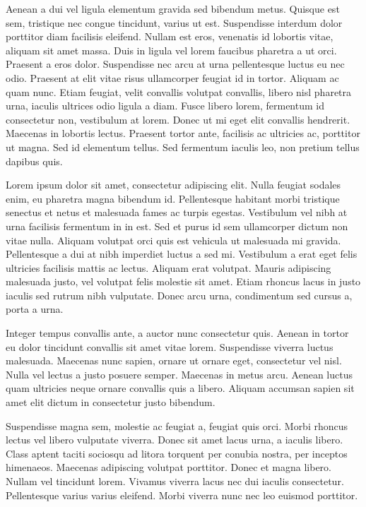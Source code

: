 \documentclass[a4paper]{article}
\begin{document}
Aenean a dui vel ligula elementum gravida sed bibendum metus. Quisque est sem, tristique nec congue tincidunt, varius ut est. Suspendisse interdum dolor porttitor diam facilisis eleifend. Nullam est eros, venenatis id lobortis vitae, aliquam sit amet massa. Duis in ligula vel lorem faucibus pharetra a ut orci. Praesent a eros dolor. Suspendisse nec arcu at urna pellentesque luctus eu nec odio. Praesent at elit vitae risus ullamcorper feugiat id in tortor. Aliquam ac quam nunc. Etiam feugiat, velit convallis volutpat convallis, libero nisl pharetra urna, iaculis ultrices odio ligula a diam. Fusce libero lorem, fermentum id consectetur non, vestibulum at lorem. Donec ut mi eget elit convallis hendrerit. Maecenas in lobortis lectus. Praesent tortor ante, facilisis ac ultricies ac, porttitor ut magna. Sed id elementum tellus. Sed fermentum iaculis leo, non pretium tellus dapibus quis.

Lorem ipsum dolor sit amet, consectetur adipiscing elit. Nulla feugiat sodales enim, eu pharetra magna bibendum id. Pellentesque habitant morbi tristique senectus et netus et malesuada fames ac turpis egestas. Vestibulum vel nibh at urna facilisis fermentum in in est. Sed et purus id sem ullamcorper dictum non vitae nulla. Aliquam volutpat orci quis est vehicula ut malesuada mi gravida. Pellentesque a dui at nibh imperdiet luctus a sed mi. Vestibulum a erat eget felis ultricies facilisis mattis ac lectus. Aliquam erat volutpat. Mauris adipiscing malesuada justo, vel volutpat felis molestie sit amet. Etiam rhoncus lacus in justo iaculis sed rutrum nibh vulputate. Donec arcu urna, condimentum sed cursus a, porta a urna.

Integer tempus convallis ante, a auctor nunc consectetur quis. Aenean in tortor eu dolor tincidunt convallis sit amet vitae lorem. Suspendisse viverra luctus malesuada. Maecenas nunc sapien, ornare ut ornare eget, consectetur vel nisl. Nulla vel lectus a justo posuere semper. Maecenas in metus arcu. Aenean luctus quam ultricies neque ornare convallis quis a libero. Aliquam accumsan sapien sit amet elit dictum in consectetur justo bibendum.

Suspendisse magna sem, molestie ac feugiat a, feugiat quis orci. Morbi rhoncus lectus vel libero vulputate viverra. Donec sit amet lacus urna, a iaculis libero. Class aptent taciti sociosqu ad litora torquent per conubia nostra, per inceptos himenaeos. Maecenas adipiscing volutpat porttitor. Donec et magna libero. Nullam vel tincidunt lorem. Vivamus viverra lacus nec dui iaculis consectetur. Pellentesque varius varius eleifend. Morbi viverra nunc nec leo euismod porttitor.
\end{document}

